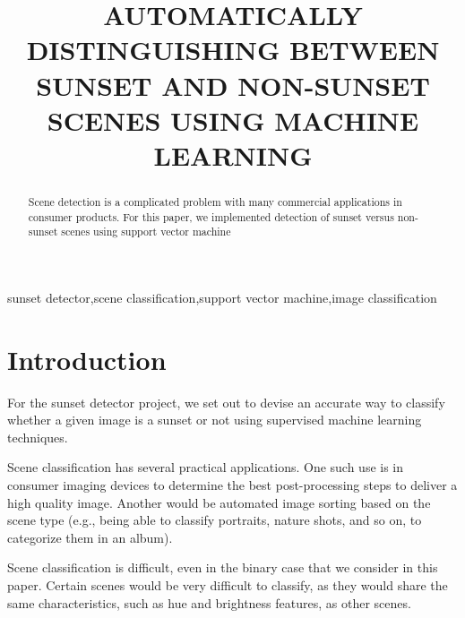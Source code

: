 \documentclass{article}
\begin{document}
\sloppy

\title{AUTOMATICALLY DISTINGUISHING BETWEEN SUNSET AND NON-SUNSET SCENES USING MACHINE LEARNING}
%
\address{Rose-Hulman Institute of Technology \\
Email: kampernj@rose-hulman.edu and henderea@rose-hulman.edu}


\maketitle
\thispagestyle{fancy} \fancyhead{} \lhead{}
\renewcommand{\headrulewidth}{0pt}
\renewcommand{\footrulewidth}{0pt}




%
\begin{abstract}
Scene detection is a complicated problem with many commercial applications in 
consumer products. For this paper, we implemented detection of sunset versus 
non-sunset scenes using  support vector machine
\end{abstract}

%
\begin{keywords}
sunset detector,scene classification,support vector machine,image classification
\end{keywords}

%
\section{Introduction}
\label{sec:intro}
For the sunset detector project, we set out to devise an accurate way to classify
whether a given image is a sunset or not using supervised machine learning techniques.

Scene classification has several practical applications. One such use is in consumer
imaging devices to determine the best post-processing steps to deliver a high quality
image. Another would be automated image sorting based on the scene type (e.g., being 
able to classify portraits, nature shots, and so on, to categorize them in an album). 

Scene classification is difficult, even in the binary case that we consider in this
paper. Certain scenes would be very difficult to classify, as they would share the
same characteristics, such as hue and brightness features, as other scenes.
\end{document}
